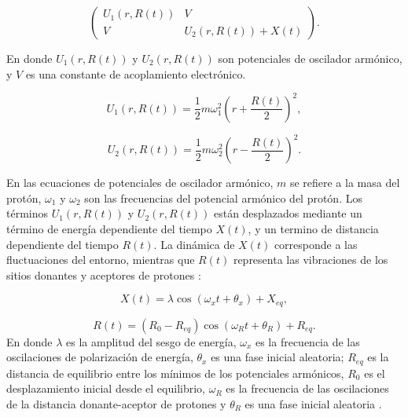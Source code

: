 \begin{equation}
  \label{eq:matrixPot}
  \begin{pmatrix}
    U_1(r,R(t)) &   V \\
    V           & U_2(r,R(t))+X(t)
  \end{pmatrix}.
\end{equation}

En donde $U_1(r,R(t))$ y  $U_2(r,R(t))$ son potenciales de oscilador armónico, y $V$ es una constante de acoplamiento electrónico.

\begin{equation}
  \label{eq:U1}
  U_1(r,R(t))=\frac{1}{2}m\omega_1^2\left( r + \frac{R(t)}{2} \right)^2,
\end{equation}

\begin{equation}
  \label{eq:U2}
  U_2(r,R(t))=\frac{1}{2}m\omega_2^2\left( r - \frac{R(t)}{2} \right)^2.
\end{equation}

En las ecuaciones de potenciales de oscilador armónico, $m$ se refiere a la masa del protón, $\omega_1$ y $\omega_2$  son las frecuencias del potencial armónico del protón. Los términos $U_1(r,R(t))$ y  $U_2(r,R(t))$ están desplazados mediante un término de energía dependiente del tiempo $X(t)$, y un termino de distancia dependiente del tiempo $R(t)$. La dinámica de $X(t)$ corresponde a las fluctuaciones del entorno, mientras que $R(t)$ representa las vibraciones de los sitios donantes y aceptores de protones \cite{Main:2021}:

\begin{equation}
  \label{eq:X(t)}
  X(t)=\lambda \cos(\omega_xt+\theta_x)+X_{eq},
\end{equation}

\begin{equation}
  \label{eq:R(t)}
  R(t)=(R_0-R_{eq})\cos(\omega_Rt + \theta_R) + R_{eq}.
\end{equation}
En donde $\lambda$ es la amplitud del sesgo de energía, $\omega_x$ es la frecuencia de las oscilaciones de polarización de energía, $\theta_x$ es una fase inicial aleatoria; $R_{eq}$ es la distancia de equilibrio entre los mínimos de los potenciales armónicos, $R_0$ es el desplazamiento inicial desde el equilibrio, $\omega_R$ es la frecuencia de las oscilaciones de la distancia donante-aceptor de protones y $\theta_R$ es una fase inicial aleatoria \cite{Main:2021}.



